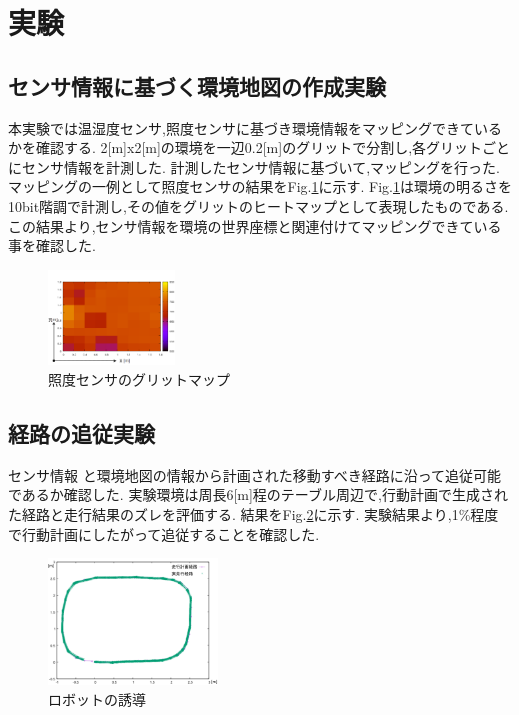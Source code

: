 \documentclass[10pt]{jsarticle}
\begin{document}
\section{実験}
\subsection{センサ情報に基づく環境地図の作成実験}
\label{sec_map}
本実験では温湿度センサ,照度センサに基づき環境情報をマッピングできているかを確認する.
2[m]x2[m]の環境を一辺0.2[m]のグリットで分割し,各グリットごとにセンサ情報を計測した.
計測したセンサ情報に基づいて,マッピングを行った.
マッピングの一例として照度センサの結果をFig.\ref{light_map}に示す.
Fig.\ref{light_map}は環境の明るさを10bit階調で計測し,その値をグリットのヒートマップとして表現したものである.
この結果より,センサ情報を環境の世界座標と関連付けてマッピングできている事を確認した.
\begin{figure}[t]
    \centering
    \includegraphics[width=0.3\textwidth]{img/light_xya.png}
    \caption{照度センサのグリットマップ}
    \label{light_map}
\end{figure}
\subsection{経路の追従実験}
\label{sec_keiro}
センサ情報 と環境地図の情報から計画された移動すべき経路に沿って追従可能であるか確認した.
実験環境は周長6[m]程のテーブル周辺で,行動計画で生成された経路と走行結果のズレを評価する.
結果をFig.\ref{tsuizyu}に示す.
実験結果より,1\%程度で行動計画にしたがって追従することを確認した.
\begin{figure}[t]
    \centering
    \includegraphics[width=0.4\textwidth]{img/tsuizyua.png}
    \caption{ロボットの誘導}
    \label{tsuizyu}
\end{figure}
\end{document}
